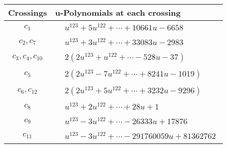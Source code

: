 \documentclass[1p]{elsarticle_modified}
\theoremstyle{definition}
\begin{document}
\begin{tabular}{m{50pt}|m{274pt}}
Crossings & \hspace{64pt}u-Polynomials at each crossing \\
\hline $$\begin{aligned}c_{1}\end{aligned}$$&$\begin{aligned}
&u^{123}+5 u^{122}+\cdots+10661 u-6658
\end{aligned}$\\
\hline $$\begin{aligned}c_{2},c_{7}\end{aligned}$$&$\begin{aligned}
&u^{123}+3 u^{122}+\cdots+33083 u-2983
\end{aligned}$\\
\hline $$\begin{aligned}c_{3},c_{4},c_{10}\end{aligned}$$&$\begin{aligned}
&2(2 u^{123}+u^{122}+\cdots-528 u-37)
\end{aligned}$\\
\hline $$\begin{aligned}c_{5}\end{aligned}$$&$\begin{aligned}
&2(2 u^{123}-7 u^{122}+\cdots+8241 u-1019)
\end{aligned}$\\
\hline $$\begin{aligned}c_{6},c_{12}\end{aligned}$$&$\begin{aligned}
&2(2 u^{123}+5 u^{122}+\cdots+3232 u-9296)
\end{aligned}$\\
\hline $$\begin{aligned}c_{8}\end{aligned}$$&$\begin{aligned}
&u^{123}+2 u^{122}+\cdots+28 u+1
\end{aligned}$\\
\hline $$\begin{aligned}c_{9}\end{aligned}$$&$\begin{aligned}
&u^{123}-3 u^{122}+\cdots-26333 u+17876
\end{aligned}$\\
\hline $$\begin{aligned}c_{11}\end{aligned}$$&$\begin{aligned}
&u^{123}-3 u^{122}+\cdots-291760059 u+81362762
\end{aligned}$\\
\hline
\end{tabular}\\~\\
\end{document}
